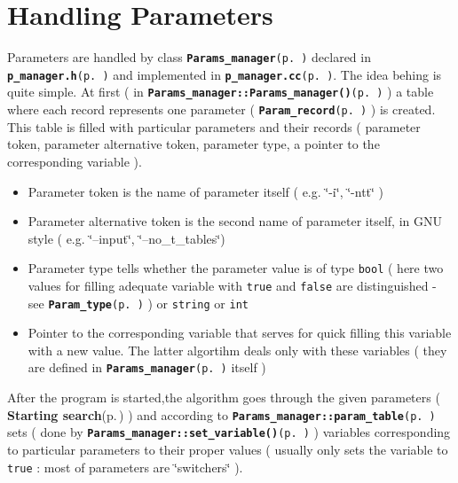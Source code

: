\section{Handling Parameters}\label{page_1}
Parameters are handled by class {\tt {\bf Params\_\-manager}{\rm (p.\,\pageref{classParams__manager})}} declared in {\tt {\bf p\_\-manager.h}{\rm (p.\,\pageref{p__manager_8h})}} and implemented in {\tt {\bf p\_\-manager.cc}{\rm (p.\,\pageref{p__manager_8cc})}}. The idea behing is quite simple. At first ( in {\tt {\bf Params\_\-manager::Params\_\-manager()}{\rm (p.\,\pageref{classParams__manager_a0})}} ) a table where each record represents one parameter ( {\tt {\bf Param\_\-record}{\rm (p.\,\pageref{structParam__record})}} ) is created. This table is filled with particular parameters and their records ( parameter token, parameter alternative token, parameter type, a pointer to the corresponding variable ).\begin{itemize}
\item Parameter token is the name of parameter itself ( e.g. \char`\"{}-i\char`\"{}, \char`\"{}-ntt\char`\"{} )\item Parameter alternative token is the second name of parameter itself, in GNU style ( e.g. \char`\"{}--input\char`\"{}, \char`\"{}--no\_\-t\_\-tables\char`\"{})\item Parameter type tells whether the parameter value is of type {\tt bool} ( here two values for filling adequate variable with {\tt true} and {\tt false} are distinguished - see {\tt {\bf Param\_\-type}{\rm (p.\,\pageref{p__manager_8h_a6})}} ) or {\tt string} or {\tt int} \item Pointer to the corresponding variable that serves for quick filling this variable with a new value. The latter algortihm deals only with these variables ( they are defined in {\tt {\bf Params\_\-manager}{\rm (p.\,\pageref{classParams__manager})}} itself )\end{itemize}


After the program is started,the algorithm goes through the given parameters ( {\bf Starting search}{\rm (p.\,\pageref{page_2})} ) and according to {\tt {\bf Params\_\-manager::param\_\-table}{\rm (p.\,\pageref{classParams__manager_r0})}} sets ( done by {\tt {\bf Params\_\-manager::set\_\-variable()}{\rm (p.\,\pageref{classParams__manager_a23})}} ) variables corresponding to particular parameters to their proper values ( usually only sets the variable to {\tt true} : most of parameters are \char`\"{}switchers\char`\"{} ).

